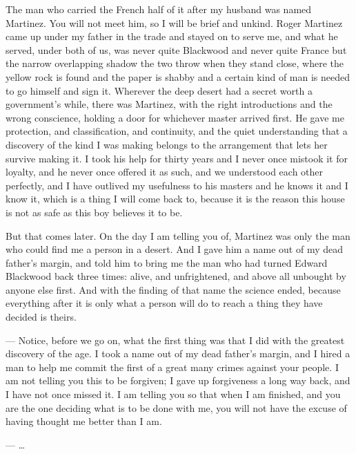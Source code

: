 The man who carried the French half of it after my husband was named Martinez. You will not meet him, so I will be brief and unkind. Roger Martinez came up under my father in the trade and stayed on to serve me, and what he served, under both of us, was never quite Blackwood and never quite France but the narrow overlapping shadow the two throw when they stand close, where the yellow rock is found and the paper is shabby and a certain kind of man is needed to go himself and sign it. Wherever the deep desert had a secret worth a government's while, there was Martinez, with the right introductions and the wrong conscience, holding a door for whichever master arrived first. He gave me protection, and classification, and continuity, and the quiet understanding that a discovery of the kind I was making belongs to the arrangement that lets her survive making it. I took his help for thirty years and I never once mistook it for loyalty, and he never once offered it as such, and we understood each other perfectly, and I have outlived my usefulness to his masters and he knows it and I know it, which is a thing I will come back to, because it is the reason this house is not as safe as this boy believes it to be.\par

But that comes later. On the day I am telling you of, Martinez was only the man who could find me a person in a desert. And I gave him a name out of my dead father's margin, and told him to bring me the man who had turned Edward Blackwood back three times: alive, and unfrightened, and above all unbought by anyone else first. And with the finding of that name the science ended, because everything after it is only what a person will do to reach a thing they have decided is theirs.\par

\begin{room}

--- Notice, before we go on, what the first thing was that I did with the greatest discovery of the age. I took a name out of my dead father's margin, and I hired a man to help me commit the first of a great many crimes against your people. I am not telling you this to be forgiven; I gave up forgiveness a long way back, and I have not once missed it. I am telling you so that when I am finished, and you are the one deciding what is to be done with me, you will not have the excuse of having thought me better than I am.

--- \ldots{}

\end{room}
